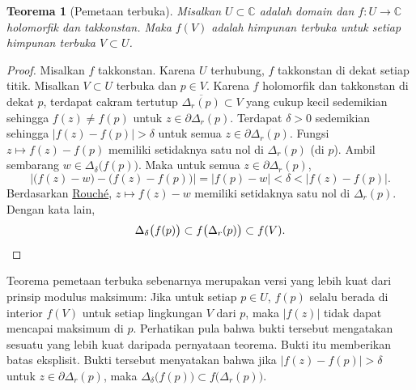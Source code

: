 \documentclass[12pt,openany]{book}
\newcommand{\sabs}[1]{\lvert {#1} \rvert}
\newcommand{\abs}[1]{\left\lvert {#1} \right\rvert}
\newcommand{\C}{{\mathbb{C}}}
\theoremstyle{plain}
\newtheorem{thm}{Teorema}[section]
\theoremstyle{remark}
\theoremstyle{definition}
\theoremstyle{exercise}
\theoremstyle{example}
\begin{document}
\begin{thm}[Pemetaan terbuka]\label{thm:OMT}
Misalkan $U \subset \C$ adalah domain dan $f \colon U \to \C$
holomorfik dan takkonstan.  Maka $f(V)$ adalah himpunan terbuka untuk setiap himpunan terbuka
$V \subset U$.
\end{thm}

\begin{proof}
Misalkan $f$ takkonstan.  Karena $U$ terhubung, $f$ takkonstan
di dekat setiap titik.
Misalkan $V \subset U$ terbuka dan $p \in V$.
Karena $f$
holomorfik dan takkonstan di dekat $p$,  
terdapat cakram tertutup $\overline{\Delta_r(p)} \subset V$ yang cukup kecil sedemikian sehingga
$f(z) \neq f(p)$ untuk $z \in \partial \Delta_r(p)$.
Terdapat $\delta > 0$ sedemikian
sehingga $\abs{f(z)-f(p)} > \delta$ untuk semua $z \in \partial \Delta_r(p)$.
Fungsi $z \mapsto f(z)-f(p)$ memiliki setidaknya satu nol di $\Delta_r(p)$
(di $p$).  Ambil sembarang $w \in \Delta_{\delta}\bigl(f(p)\bigr)$.  Maka untuk
semua $z \in \partial \Delta_r(p)$,
\begin{equation*}
\abs{\bigl( f(z)-w \bigr) - \bigl( f(z)-f(p) \bigr)} = \abs{f(p)-w} <
\delta < \abs{f(z)-f(p)} .
\end{equation*}
Berdasarkan \hyperref[thm:rouche2]{Rouch\'e}, $z \mapsto f(z)-w$ memiliki setidaknya satu
nol di $\Delta_r(p)$.
Dengan kata lain,
\begin{equation*}
\Delta_{\delta}\bigl(f(p)\bigr) \subset
f\bigl(\Delta_r(p)\bigr) \subset f(V) .  \qedhere
\end{equation*}
\end{proof}

Teorema pemetaan terbuka sebenarnya merupakan versi yang lebih kuat dari
prinsip modulus maksimum:
Jika untuk setiap $p \in U$,
$f(p)$ selalu berada di interior $f(V)$ untuk setiap lingkungan $V$ dari
$p$, maka $\sabs{f(z)}$ tidak dapat mencapai maksimum di $p$.
Perhatikan pula bahwa bukti tersebut mengatakan sesuatu yang lebih kuat daripada pernyataan teorema.  Bukti itu
memberikan batas eksplisit.  Bukti tersebut menyatakan bahwa jika 
$\abs{f(z)-f(p)} > \delta$ untuk $z \in \partial \Delta_r(p)$,
maka
$\Delta_{\delta}\bigl(f(p)\bigr) \subset f\bigl(\Delta_r(p)\bigr)$.
\end{document}
